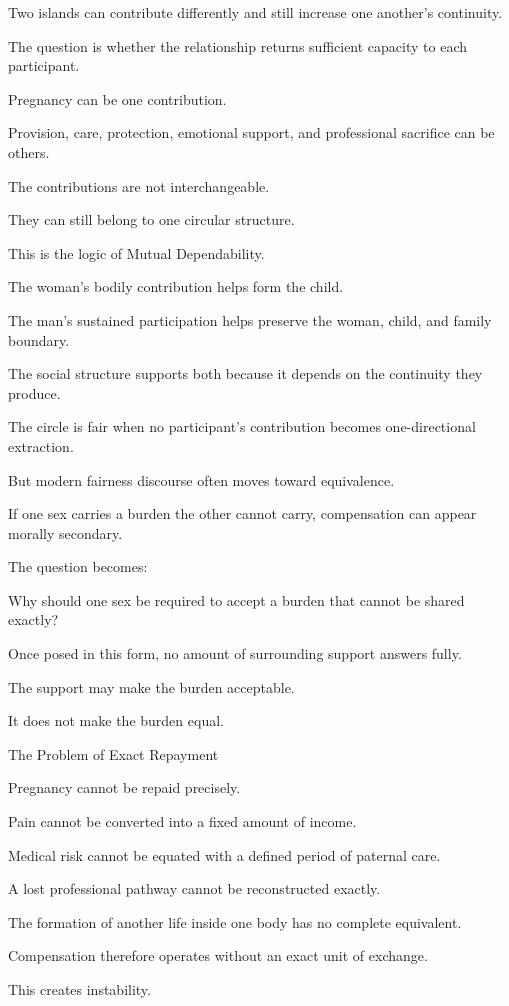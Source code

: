 Two islands can contribute differently and still increase one another’s continuity.

The question is whether the relationship returns sufficient capacity to each participant.

Pregnancy can be one contribution.

Provision, care, protection, emotional support, and professional sacrifice can be others.

The contributions are not interchangeable.

They can still belong to one circular structure.

This is the logic of Mutual Dependability.

The woman’s bodily contribution helps form the child.

The man’s sustained participation helps preserve the woman, child, and family boundary.

The social structure supports both because it depends on the continuity they produce.

The circle is fair when no participant’s contribution becomes one-directional extraction.

But modern fairness discourse often moves toward equivalence.

If one sex carries a burden the other cannot carry, compensation can appear morally secondary.

The question becomes:

Why should one sex be required to accept a burden that cannot be shared exactly?

Once posed in this form, no amount of surrounding support answers fully.

The support may make the burden acceptable.

It does not make the burden equal.

The Problem of Exact Repayment

Pregnancy cannot be repaid precisely.

Pain cannot be converted into a fixed amount of income.

Medical risk cannot be equated with a defined period of paternal care.

A lost professional pathway cannot be reconstructed exactly.

The formation of another life inside one body has no complete equivalent.

Compensation therefore operates without an exact unit of exchange.

This creates instability.

